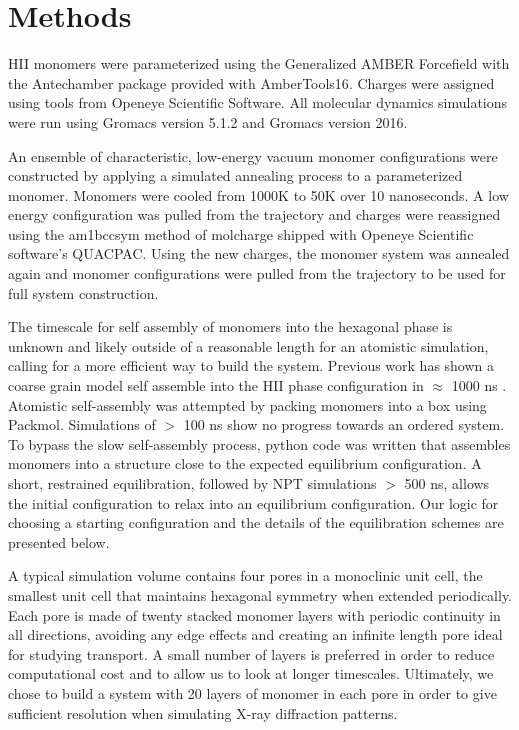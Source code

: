\section{Methods}
	
HII monomers were parameterized using the Generalized AMBER Forcefield
\cite{wang_development_2004} with the Antechamber package\cite{wang_automatic_2006}
provided with AmberTools16\cite{case_ambertools16_2016}. Charges were
assigned using tools from Openeye Scientific Software. All molecular 
dynamics simulations were run using Gromacs version 5.1.2 and Gromacs 
version 2016. \cite{bekker_gromacs:_1993,berendsen_gromacs:_1995,
van_der_spoel_gromacs:_2005,hess_gromacs_2008}
	
An ensemble of characteristic, low-energy vacuum monomer configurations
were constructed by applying a simulated annealing process to a
parameterized monomer. Monomers were cooled from 1000K to 50K over 10
nanoseconds. A low energy configuration was pulled from the trajectory 
and charges were reassigned using the am1bccsym method of molcharge
shipped with Openeye Scientific software's QUACPAC. Using the new
charges, the monomer system was annealed again and monomer
configurations were pulled from the trajectory to be used for full
system construction.
	
The timescale for self assembly of monomers into the hexagonal phase is
unknown and likely outside of a reasonable length for an atomistic
simulation, calling for a more efficient way to build the system. 
Previous work has shown a coarse grain model self assemble into the HII
phase configuration in $\approx$ 1000 ns \cite{mondal_self-assembly_2013}.
Atomistic self-assembly was attempted by packing monomers into a box 
using Packmol\cite{martinez_packmol:_2009}. Simulations of $>$ 100 ns 
show no progress towards an ordered system. To bypass the slow self-assembly
process, python code was written that assembles monomers into a structure 
close to the expected equilibrium configuration. A short, restrained 
equilibration, followed by NPT simulations $>$ 500 ns, allows the initial
configuration to relax into an equilibrium configuration. Our logic for
choosing a starting configuration and the details of the equilibration 
schemes are presented below.

A typical simulation volume contains four pores in a monoclinic unit cell,
the smallest unit cell that maintains hexagonal symmetry when extended 
periodically. Each pore is made of twenty stacked monomer layers with
periodic continuity in all directions, avoiding any edge effects and 
creating an infinite length pore ideal for studying transport. A small
number of layers is preferred in order to reduce computational cost and 
to allow us to look at longer timescales. Ultimately, we chose to build a system
with 20 layers of monomer in each pore in order to give sufficient
resolution when simulating X-ray diffraction patterns.

